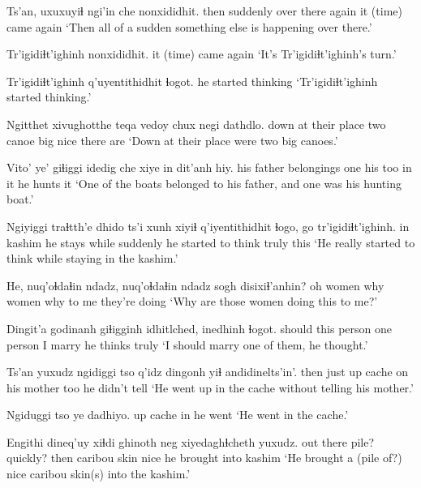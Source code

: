 \documentclass[12pt]{article}
\begin{document}
\gll Ts'an, uxuxuyiɬ        ngi'in   che   nonxididhit.
then  suddenly {over there} again {it (time) came again}
\glt `Then all of a sudden something else is happening over there.'
\glend

\gll Tr'igidiɬt'ighinh nonxididhit.
{}                 {it (time) came again}
\glt `It's Tr'igidiɬt'ighinh's turn.'
\glend

\gll Tr'igidiɬt'ighinh q'uyentithidhit     ɬogot.
{}                {he started thinking} {}
\glt `Tr'igidiɬt'ighinh started thinking.'
\glend

\gll Ngitthet xivughotthe   teqa vedoy chux negi dathdlo.
down     {at their place} two  canoe big  nice {there are}
\glt `Down at their place were two big canoes.'
\glend

\gll Vito' ye'               giɬiggi idedig che xiye {in dit'anh} hiy.
{his father} belongings one     his    too {in it} {he hunts} it
\glt `One of the boats belonged to his father, and one was his hunting boat.'
\glend

\gll Ngiyiggi traɬtth'e dhido    ts'i  {xunh xiyiɬ} q'iyentithidhit     ɬogo, go tr'igidiɬt'ighinh.
in       kashim    {he stays} while suddenly  {he started to think} truly this {}
\glt `He really started to think while staying in the kashim.'
\glend

\gll He, nuq'oɬdaɬin ndadz, nuq'oɬdaɬin ndadz sogh disixiɬ'anhin?
oh women       why  women       why   {to me} {they're doing}
\glt `Why are those women doing this to me?'
\glend

\gll Dingit'a godinanh giɬigginh idhitlched, inedhinh ɬogot.
should   {this person}  {one person} {I marry} {he thinks} truly
\glt `I should marry one of them, he thought.'
\glend

\gll Ts'an yuxudz ngidiggi tso   q'idz dingonh  yiɬ  {andidinelts'in'}.
then  just   up       cache on    {his mother} too {he didn't tell}
\glt `He went up in the cache without telling his mother.'
\glend

\gll Ngiduggi tso   ye dadhiyo.
up       cache in {he went}
\glt `He went in the cache.'
\glend

\gll Engithi    dineq'uy xiɬdi ghinoth      neg  xiyedaghɬcheth yuxudz. 
{out there} {pile? quickly?}  then  {caribou skin} nice {he brought into kashim}
\glt `He brought a (pile of?) nice caribou skin(s) into the kashim.'
\glend
\end{document}

